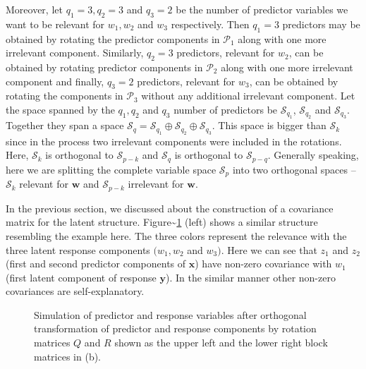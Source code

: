 \documentclass[num-refs]{wiley-article}
\begin{document}
Moreover, let \(q_1 = 3, q_2 = 3\) and \(q_3 = 2\) be the number of
predictor variables we want to be relevant for \(w_1, w_2\) and \(w_3\)
respectively. Then \(q_1 = 3\) predictors may be obtained by rotating
the predictor components in \(\mathcal{P}_1\) along with one more
irrelevant component. Similarly, \(q_2 = 3\) predictors, relevant for
\(w_2\), can be obtained by rotating predictor components in
\(\mathcal{P}_2\) along with one more irrelevant component and finally,
\(q_3 = 2\) predictors, relevant for \(w_3\), can be obtained by
rotating the components in \(\mathcal{P}_3\) without any additional
irrelevant component. Let the space spanned by the \(q_1, q_2\) and
\(q_3\) number of predictors be \(\mathcal{S}_{q_1}\),
\(\mathcal{S}_{q_2}\) and \(\mathcal{S}_{q_3}\). Together they span a
space
\(\mathcal{S}_q = \mathcal{S}_{q_1} \oplus \mathcal{S}_{q_2} \oplus \mathcal{S}_{q_3}\).
This space is bigger than \(\mathcal{S}_k\) since in the process two
irrelevant components were included in the rotations. Here,
\(\mathcal{S}_k\) is orthogonal to \(\mathcal{S}_{p - k}\) and
\(\mathcal{S}_q\) is orthogonal to \(\mathcal{S}_{p - q}\). Generally
speaking, here we are splitting the complete variable space
\(\mathcal{S}_p\) into two orthogonal spaces -- \(\mathcal{S}_k\)
relevant for \(\mathbf{w}\) and \(\mathcal{S}_{p - k}\) irrelevant for
\(\mathbf{w}\).

In the previous section, we discussed about the construction of a
covariance matrix for the latent structure.
Figure\textasciitilde{}\ref{fig:cov-plot-print} (left) shows a similar
structure resembling the example here. The three colors represent the
relevance with the three latent response components \((w_1, w_2\) and
\(w_3)\). Here we can see that \(z_{1}\) and \(z_{2}\) (first and second
predictor components of \(\mathbf{x}\)) have non-zero covariance with
\(w_1\) (first latent component of response \(\mathbf{y}\)). In the
similar manner other non-zero covariances are self-explanatory.

\begin{figure}
\caption{Simulation of predictor and response variables after orthogonal transformation of predictor and response components by rotation matrices $Q$ and $R$ shown as the upper left and the lower right block matrices in (b).}\label{fig:cov-plot-print}
\end{figure}
\end{document}
